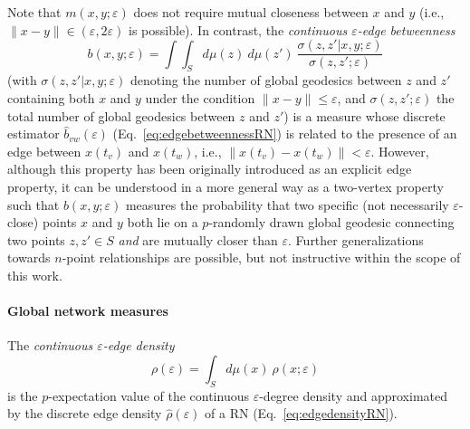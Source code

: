 Note that $m(x,y;\varepsilon)$ does not require mutual closeness between $x$ and $y$ (i.e., $\|x-y\|\in(\varepsilon,2\varepsilon)$ is possible). In contrast, the \emph{continuous $\varepsilon$-edge betweenness}
\begin{equation}
b(x,y;\varepsilon)=\int\int_S d\mu(z)\ d\mu(z')\ \frac{\sigma(z,z'|x,y;\varepsilon)}{\sigma(z,z';\varepsilon)}
\end{equation}
\noindent
(with $\sigma(z,z'|x,y;\varepsilon)$ denoting the number of global geodesics between $z$ and $z'$ containing both $x$ and $y$ under the condition $\|x-y\|\leq\varepsilon$, and $\sigma(z,z';\varepsilon)$ the total number of global geodesics between $z$ and $z'$) is a measure whose discrete estimator $\hat{b}_{vw}(\varepsilon)$ (Eq.~\ref{eq:edgebetweennessRN}) is related to the presence of an edge between $x(t_v)$ and $x(t_w)$, i.e., $\|x(t_v)-x(t_w)\|< \varepsilon$. However, although this property has been originally introduced as an explicit edge property, it can be understood in a more general way as a two-vertex property such that $b(x,y;\varepsilon)$ measures the probability that two specific (not necessarily $\varepsilon$-close) points $x$ and $y$ both lie on a $p$-randomly drawn global geodesic connecting two points $z,z'\in S$ \emph{and} are mutually closer than $\varepsilon$. Further generalizations towards $n$-point relationships are possible, but not instructive within the scope of this work.


\paragraph{Global network measures}

The \emph{continuous $\varepsilon$-edge density}
\begin{equation}
\rho(\varepsilon)=\int_S d\mu(x)\ \rho(x;\varepsilon)
\end{equation}
\noindent
is the $p$-expectation value of the continuous $\varepsilon$-degree density and approximated by the discrete edge density $\hat{\rho}(\varepsilon)$ of a RN (Eq.~\ref{eq:edgedensityRN}).

